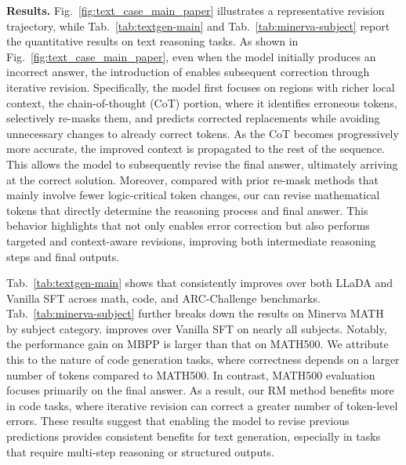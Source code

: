 



\textbf{Results.}
Fig.~\ref{fig:text_case_main_paper} illustrates a representative revision trajectory, while Tab.~\ref{tab:textgen-main} and Tab.~\ref{tab:minerva-subject} report the quantitative results on text reasoning tasks. As shown in Fig.~\ref{fig:text_case_main_paper}, even when the model initially produces an incorrect answer, the introduction of \method enables subsequent correction through iterative revision. Specifically, the model first focuses on regions with richer local context, the chain-of-thought (CoT) portion, where it identifies erroneous tokens, selectively re-masks them, and predicts corrected replacements while avoiding unnecessary changes to already correct tokens. As the CoT becomes progressively more accurate, the improved context is propagated to the rest of the sequence. This allows the model to subsequently revise the final answer, ultimately arriving at the correct solution. Moreover, compared with prior re-mask methods that mainly involve fewer logic-critical token changes, our \method can revise mathematical tokens that directly determine the reasoning process and final answer. This behavior highlights that \method not only enables error correction but also performs targeted and context-aware revisions, improving both intermediate reasoning steps and final outputs.


Tab.~\ref{tab:textgen-main} shows that \method consistently improves over both LLaDA and Vanilla SFT across math, code, and ARC-Challenge benchmarks. Tab.~\ref{tab:minerva-subject} further breaks down the results on Minerva MATH~\citep{lewkowycz2022solving} by subject category. \method improves over Vanilla SFT on nearly all subjects. Notably, the performance gain on MBPP is larger than that on MATH500. We attribute this to the nature of code generation tasks, where correctness depends on a larger number of tokens compared to MATH500. In contrast, MATH500 evaluation focuses primarily on the final answer. As a result, our RM method benefits more in code tasks, where iterative revision can correct a greater number of token-level errors. These results suggest that enabling the model to revise previous predictions provides consistent benefits for text generation, especially in tasks that require multi-step reasoning or structured outputs.